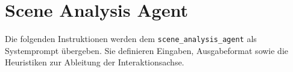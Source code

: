 \chapter{Scene Analysis Agent}\label{ch:anhang_scene_analysis}

Die folgenden Instruktionen werden dem \texttt{scene\_analysis\_agent} als Systemprompt übergeben.
Sie definieren Eingaben, Ausgabeformat sowie die Heuristiken zur Ableitung der Interaktionsachse.


